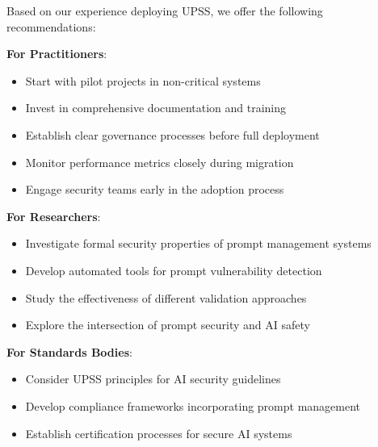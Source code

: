 Based on our experience deploying UPSS, we offer the following recommendations:

\textbf{For Practitioners}:
\begin{itemize}
    \item Start with pilot projects in non-critical systems
    \item Invest in comprehensive documentation and training
    \item Establish clear governance processes before full deployment
    \item Monitor performance metrics closely during migration
    \item Engage security teams early in the adoption process
\end{itemize}

\textbf{For Researchers}:
\begin{itemize}
    \item Investigate formal security properties of prompt management systems
    \item Develop automated tools for prompt vulnerability detection
    \item Study the effectiveness of different validation approaches
    \item Explore the intersection of prompt security and AI safety
\end{itemize}

\textbf{For Standards Bodies}:
\begin{itemize}
    \item Consider UPSS principles for AI security guidelines
    \item Develop compliance frameworks incorporating prompt management
    \item Establish certification processes for secure AI systems
\end{itemize}
